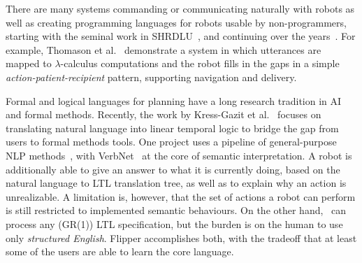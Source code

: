 \documentclass[letterpaper, 10 pt, conference]{ieeeconf}  %
\newcommand{\tool}{Flipper\xspace}
\begin{document}
There are many systems commanding or communicating naturally with robots as well as creating programming
languages for robots usable by non-programmers, starting with the seminal work in SHRDLU~\cite{shrdlu},
and continuing over the years~\cite{kollarDialog,thomasonDialog,roboFlow}.
For example, Thomason et al.~\cite{thomasonDialog} demonstrate a system in which
utterances are mapped to $\lambda$-calculus computations and the robot 
fills in the gaps in a simple \textit{action-patient-recipient} pattern, supporting
navigation and delivery.
%

Formal and logical languages for planning have a long research tradition in AI and formal methods.
Recently, the work by Kress-Gazit et
al.~\cite{hadasTranslatingStructuredEnglish,hadasLTLMop,
hadasProvablyCorrectReactiveControlFromNaturalLanguage} focuses on translating
natural language into linear temporal logic to bridge the gap from users to formal methods
tools.
One project uses a pipeline of general-purpose NLP 
methods~\cite{hadasProvablyCorrectReactiveControlFromNaturalLanguage}, with VerbNet~\cite{schulerVerbnet}
at the core of semantic interpretation. A robot is additionally able
to give an answer to what it is currently doing, based on the natural language
to LTL translation tree, as well as to explain why an action is unrealizable. A
limitation is, however, that the set of actions a robot can perform is still
restricted to implemented semantic behaviours. On the other hand,~\cite{hadasTranslatingStructuredEnglish}
can process any (GR(1)) LTL specification, but the burden is on the human to use
only \emph{structured English}. \tool accomplishes both, with the tradeoff 
that at least some of the users are able to learn the core language.
\end{document}
